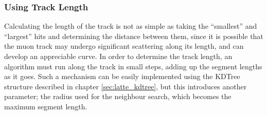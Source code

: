 \subsubsection{Using Track Length}
Calculating the length of the track is not as simple as taking the ``smallest'' and ``largest'' hits and determining the distance between them, since it is possible that the muon track may undergo significant scattering along its length, and can develop an appreciable curve. In order to determine the track length, an algorithm must run along the track in small steps, adding up the segment lengths as it goes. Such a mechanism can be easily implemented using the \ac{KDTree} structure described in chapter \ref{sec:latte_kdtree}, but this introduces another parameter; the radius used for the neighbour search, which becomes the maximum segment length.

